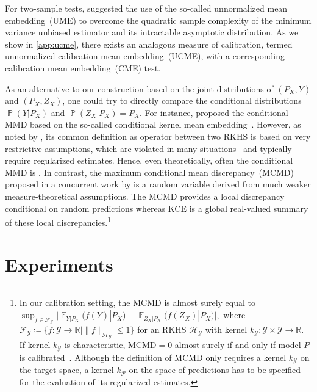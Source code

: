 \documentclass{article}
\DeclareMathOperator{\Prob}{\mathbb{P}}
\DeclareMathOperator{\Exp}{\mathbb{E}}
\begin{document}
For two-sample tests, \citet{Chwialkowski2015} suggested the use
of the so-called unnormalized mean embedding~(UME) to overcome
the quadratic sample complexity of the minimum variance unbiased
estimator and its intractable asymptotic distribution. As we show
in \cref{app:ucme}, there exists an analogous measure of calibration,
termed unnormalized calibration mean embedding~(UCME), with a corresponding
calibration mean embedding~(CME) test.

As an alternative to our construction based on the
joint distributions of $(P_X, Y)$ and $(P_X, Z_X)$, one could try
to directly compare the conditional distributions $\Prob(Y|P_X)$
and $\Prob(Z_X|P_X) = P_X$. For instance, \citet{Ren2016} proposed the
conditional MMD based on the so-called conditional kernel mean
embedding~\citep{Song2009,Song2013}. However, as noted by
\citet{Park2020}, its common definition as operator
between two RKHS is based on very restrictive assumptions, which are violated
in many situations~\citep[see, e.g.,][Footnote~4]{Fukumizu2013}
and typically require regularized estimates. Hence, even theoretically,
often the conditional MMD is
.
In contrast, the maximum conditional mean discrepancy~(MCMD) proposed in a
concurrent work by \citet{Park2020} is a random variable derived from much
weaker measure-theoretical assumptions.
The MCMD provides a local discrepancy conditional on random predictions
whereas KCE is a global real-valued summary of these local
discrepancies.\footnote{In our calibration setting, the $\mathrm{MCMD}$ is
almost surely equal to
$
    \sup_{f \in \mathcal{F}_\mathcal{Y}}
    \big| \Exp_{Y|P_X}\big(f(Y)|P_X\big) - \Exp_{Z_X|P_X}\big(f(Z_X)|P_X\big) \big|,
$
where $\mathcal{F}_{\mathcal{Y}} \coloneqq \{ f \colon \mathcal{Y} \to \mathbb{R} | \|f\|_{\mathcal{H}_{\mathcal{Y}}} \leq 1 \}$
for an RKHS $\mathcal{H}_{\mathcal{Y}}$ with kernel
$k_{\mathcal{Y}} \colon \mathcal{Y} \times \mathcal{Y} \to \mathbb{R}$.
If kernel $k_{\mathcal{Y}}$ is characteristic, $\mathrm{MCMD} = 0$ almost
surely if and only if model $P$ is calibrated~\citep[Theorem~3.7]{Park2020}. Although the definition of MCMD
only requires
a kernel $k_{\mathcal{Y}}$ on the target space, a kernel $k_{\mathcal{P}}$ on the space of predictions
has to be specified for the evaluation of its regularized estimates.}

\section{Experiments}
\end{document}
